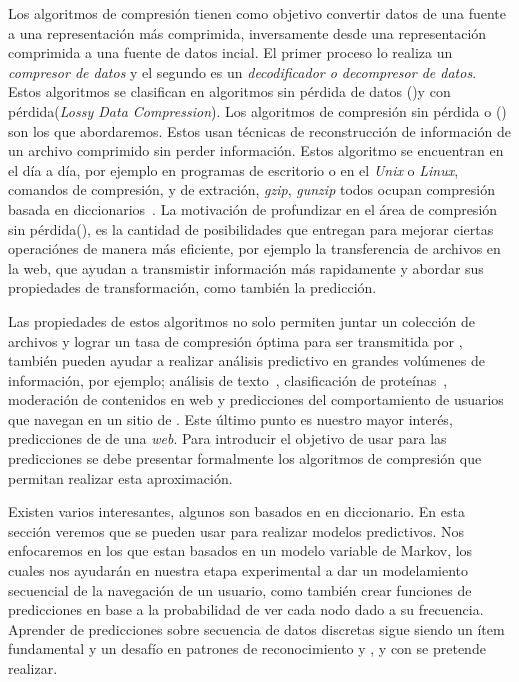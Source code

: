Los algoritmos de compresión tienen como objetivo convertir datos de una fuente a una representación más comprimida, inversamente desde una representación comprimida a una fuente de datos incial. El primer proceso lo realiza un \emph{compresor de datos} y el segundo es un \emph{decodificador o decompresor de datos}. Estos algoritmos se clasifican en algoritmos sin pérdida de datos (\losslessdatacompression)y con pérdida(\emph{Lossy Data Compression}). Los algoritmos de compresión sin pérdida o  \losslessdatacompression(\LDC) son los que abordaremos. Estos usan técnicas de reconstrucción de información de un archivo comprimido sin perder información. Estos algoritmo se encuentran en el día a día, por ejemplo en programas de escritorio o en el \emph{Unix} o \emph{Linux}, comandos de compresión, y de extración, \emph{gzip}, \emph{gunzip} todos ocupan compresión basada en diccionarios~\cite{MengyiPu2006}. La motivación de profundizar en el área de compresión sin pérdida(\LDC), es la cantidad de posibilidades que entregan para mejorar ciertas operaciónes de manera más eficiente, por ejemplo la  transferencia de archivos en la web, que ayudan a transmistir información más rapidamente y abordar sus propiedades de transformación, como también la predicción.


Las propiedades de estos algoritmos no solo permiten juntar un colección de archivos y lograr un tasa de compresión óptima para ser transmitida por \inet, también pueden ayudar a realizar análisis predictivo en grandes volúmenes de información, por ejemplo; análisis de texto~\cite{}, clasificación de proteínas~\cite{}, moderación de contenidos en web y predicciones del comportamiento de usuarios que navegan en un sitio de \inet. Este último punto es nuestro mayor interés, predicciones de \webasccesslog de una \emph{web}. Para introducir el objetivo de usar \LDC para las predicciones se debe presentar formalmente los algoritmos de compresión que permitan realizar esta aproximación.

Existen varios \losslessdatacompression interesantes, algunos son basados en en diccionario. En esta sección veremos que se pueden usar para realizar modelos predictivos. Nos enfocaremos en los que estan basados en un modelo variable de Markov, los cuales nos ayudarán en nuestra etapa experimental a dar un modelamiento secuencial de la navegación de un usuario, como también crear funciones de predicciones en base a la probabilidad de ver cada nodo dado a su frecuencia. Aprender de predicciones sobre secuencia de datos discretas sigue siendo un ítem fundamental y un desafío en patrones de reconocimiento y \machinelearning, y con \LDC se pretende realizar.















